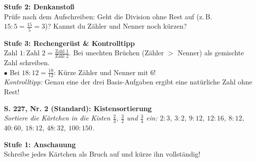 \documentclass[a4paper,10pt]{article}
\begin{document}
\begin{tcolorbox}[colback=step2Bg, colframe=step2Border, arc=1.8mm, boxrule=0.7pt, left=3mm, right=3mm, top=1.8mm, bottom=1.8mm]
    {\color{step2Text}\small\bfseries\faLightbulb\enskip Stufe 2: Denkanstoß}\\[1mm]
    {\footnotesize Prüfe nach dem Aufschreiben: Geht die Division ohne Rest auf (z.\,B. $15:5 = \frac{15}{5} = 3$)? Kannst du Zähler und Nenner noch kürzen?}
\end{tcolorbox}

\begin{tcolorbox}[colback=step3Bg, colframe=step3Border, arc=1.8mm, boxrule=0.7pt, left=3mm, right=3mm, top=1.8mm, bottom=1.8mm]
    {\color{step3Text}\small\bfseries\faTh\enskip Stufe 3: Rechengerüst \& Kontrolltipp}\\[1mm]
    {\footnotesize
    $\text{Zahl 1} : \text{Zahl 2} = \frac{\text{Zahl 1}}{\text{Zahl 2}}$. Bei unechten Brüchen (Zähler $>$ Nenner) als gemischte Zahl schreiben.\\
    $\bullet$ Bei $18 : 12 = \frac{18}{12}$: Kürze Zähler und Nenner mit $6$!\\
    \textit{Kontrolltipp:} Genau eine der drei Basis-Aufgaben ergibt eine natürliche Zahl ohne Rest!}
\end{tcolorbox}

\vspace{3.5mm}

\begin{tcolorbox}[enhanced, colback=lvlBlue!5, colframe=lvlBlue!50, arc=2mm, boxrule=0.8pt, left=3mm, right=3mm, top=2mm, bottom=2mm]
    {\bfseries\color{lvlBlue} \faStar\faStar\enskip S. 227, Nr. 2 (Standard): Kistensortierung}\\[1mm]
    {\footnotesize\textit{Sortiere die Kärtchen in die Kisten $\frac{2}{3}$, $\frac{3}{2}$ und $\frac{3}{4}$ ein: $2:3$, $3:2$, $9:12$, $12:16$, $8:12$, $40:60$, $18:12$, $48:32$, $100:150$.}}
\end{tcolorbox}

\vspace{1.5mm}

\begin{tcolorbox}[colback=step1Bg, colframe=step1Border, arc=1.8mm, boxrule=0.7pt, left=3mm, right=3mm, top=1.8mm, bottom=1.8mm]
    {\color{step1Text}\small\bfseries\faEye\enskip Stufe 1: Anschauung}\\[1mm]
    {\footnotesize Schreibe jedes Kärtchen als Bruch auf und kürze ihn vollständig!}
\end{tcolorbox}
\end{document}
